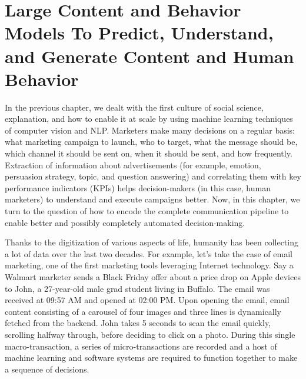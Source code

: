 \chapter{Large Content and Behavior Models To Predict, Understand, and Generate Content and Human Behavior}
\label{chatper:Content and Behavior Models}

\begin{comment}
    Communication has 7 parts
    
    Language models were trained on the message part
    
    How can behavior data help?
    
    What kind of behaviors can help?
     - Explicit behavior
     - Implicit behavior
    
     - Real vs synthetic
    
    
    How to integrate?
     - encoder
     - text to text framework
    
\end{comment}

In the previous chapter, we dealt with the first culture of social science, explanation, and how to enable it at scale by using machine learning techniques of computer vision and NLP. Marketers make many decisions on a regular basis: what marketing campaign to launch, who to target, what the message should be, which channel it should be sent on, when it should be sent, and how frequently. Extraction of information about advertisements (for example, emotion, persuasion strategy, topic, and question answering) and correlating them with key performance indicators (KPIs) helps decision-makers (in this case, human marketers) to understand and execute campaigns better. Now, in this chapter, we turn to the question of how to encode the complete communication pipeline to enable better and possibly completely automated decision-making. 


Thanks to the digitization of various aspects of life, humanity has been collecting a lot of data over the last two decades. For example, let's take the case of email marketing, one of the first marketing tools leveraging Internet technology. Say a Walmart marketer sends a Black Friday offer about a price drop on Apple devices to John, a 27-year-old male grad student living in Buffalo. The email was received at 09:57 AM and opened at 02:00 PM. Upon opening the email, email content consisting of a carousel of four images and three lines is dynamically fetched from the backend. John takes 5 seconds to scan the email quickly, scrolling halfway through, before deciding to click on a photo. During this single macro-transaction, a series of micro-transactions are recorded and a host of machine learning and software systems are required to function together to make a sequence of decisions. 

